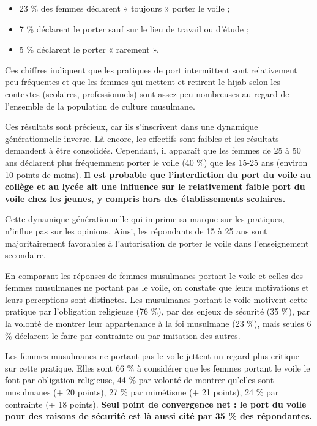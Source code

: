 \begin{itemize}
\item
  
  23 \% des femmes déclarent « toujours » porter le voile ;
  
\item
  
  7 \% déclarent le porter sauf sur le lieu de travail ou d'étude ;
  
\item
  
  5 \% déclarent le porter « rarement ».
  
\end{itemize}


Ces chiffres indiquent que les pratiques de port intermittent sont
relativement peu fréquentes et que les femmes qui mettent et retirent le
hijab selon les contextes (scolaires, professionnels) sont assez peu
nombreuses au regard de l'ensemble de la population de culture
musulmane.

Ces résultats sont précieux, car ils s'inscrivent dans une dynamique
générationnelle inverse. Là encore, les effectifs sont faibles et les
résultats demandent à être consolidés. Cependant, il apparaît que les
femmes de 25 à 50 ans déclarent plus fréquemment porter le voile (40 \%)
que les 15-25 ans (environ 10 points de moins). \textbf{Il est probable
que l'interdiction du port du voile au collège et au lycée ait une
influence sur le relativement faible port du voile chez les jeunes, y
compris hors des établissements scolaires.}


Cette dynamique générationnelle qui imprime sa marque sur les pratiques,
n'influe pas sur les opinions. Ainsi, les répondants de 15 à 25 ans sont
majoritairement favorables à l'autorisation de porter le voile dans
l'enseignement secondaire.


En comparant les réponses de femmes musulmanes portant le voile et
celles des femmes musulmanes ne portant pas le voile, on constate que
leurs motivations et leurs perceptions sont distinctes. Les musulmanes
portant le voile motivent cette pratique par l'obligation religieuse (76
\%), par des enjeux de sécurité (35 \%), par la volonté de montrer leur
appartenance à la foi musulmane (23 \%), mais seules 6 \% déclarent le
faire par contrainte ou par imitation des autres.

Les femmes musulmanes ne portant pas le voile jettent un regard plus
critique sur cette pratique. Elles sont 66 \% à considérer que les
femmes portant le voile le font par obligation religieuse, 44 \% par
volonté de montrer qu'elles sont musulmanes (+ 20 points), 27 \% par
mimétisme (+ 21 points), 24 \% par contrainte (+ 18 points).
\textbf{Seul point de convergence net : le port du voile pour des
raisons de sécurité est là aussi cité par 35 \% des répondantes.}

